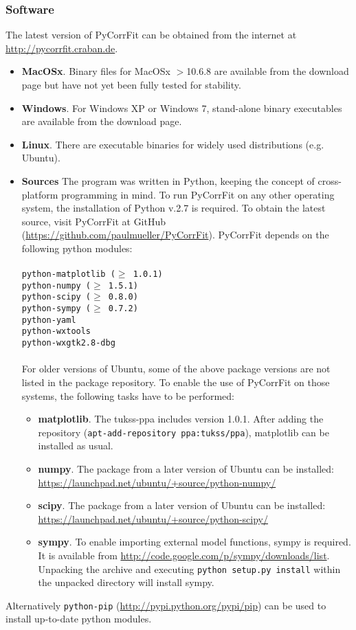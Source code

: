 \subsubsection{Software}
\label{cha:soft}
The latest version of PyCorrFit can be obtained from the internet at \url{http://pycorrfit.craban.de}.
\begin{itemize}
\item \textbf{MacOSx}.
Binary files for MacOSx $>$10.6.8 are available from the download page but have not yet been fully tested for stability.
\item \textbf{Windows}.
For Windows XP or Windows 7, stand-alone binary executables are available from the download page. 
\item \textbf{Linux}.
There are executable binaries for widely used distributions (e.g. Ubuntu).
\item \textbf{Sources}
The program was written in Python, keeping the concept of cross-platform programming in mind. To run PyCorrFit on any other operating system, the installation of Python v.2.7 is required. To obtain the latest source, visit PyCorrFit at GitHub (\url{https://github.com/paulmueller/PyCorrFit}). PyCorrFit depends on the following python modules:\\
\texttt{\\
python-matplotlib ($\geq$ 1.0.1) \\
python-numpy ($\geq$ 1.5.1) \\
python-scipy ($\geq$ 0.8.0) \\
python-sympy ($\geq$ 0.7.2) \\
python-yaml \\
python-wxtools \\
python-wxgtk2.8-dbg \\
}
\\
For older versions of Ubuntu, some of the above package versions are not listed in the package repository. To enable the use of PyCorrFit on those systems, the following tasks have to be performed:
\begin{itemize}
\item[ ] \textbf{matplotlib}. The tukss-ppa includes version 1.0.1. After adding the repository (\texttt{apt-add-repository ppa:tukss/ppa}), matplotlib can be installed as usual.
\item[ ] \textbf{numpy}. The package from a later version of Ubuntu can be installed: \url{https://launchpad.net/ubuntu/+source/python-numpy/}
\item[ ] \textbf{scipy}. The package from a later version of Ubuntu can be installed: \url{https://launchpad.net/ubuntu/+source/python-scipy/}
\item[ ] \textbf{sympy}. To enable importing external model functions, sympy is required. It is available from \url{http://code.google.com/p/sympy/downloads/list}. Unpacking the archive and executing \texttt{python setup.py install} within the unpacked directory will install sympy.
\end{itemize}
\end{itemize}
Alternatively \texttt{python-pip} (\url{http://pypi.python.org/pypi/pip}) can be used to install up-to-date python modules.

